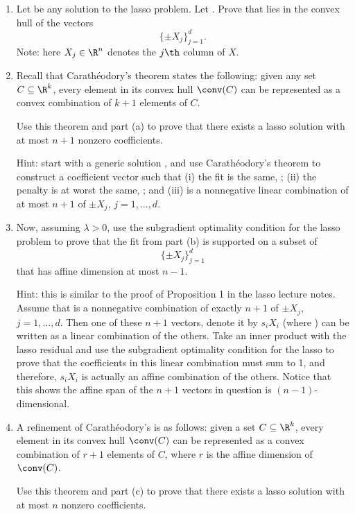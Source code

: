 \documentclass{article}
\begin{document}
\begin{enumerate}[label=(\alph*)]
\item Let \smash{$\hbeta$} be any solution to the lasso problem. Let
  . Prove that  lies in the convex hull of the vectors 
  \marginpar{\small [4 pts]}
  \[
  \{ \pm X_j \}_{j=1}^d.
  \]
  Note: here $X_j \in \R^n$ denotes the $j\th$ column of $X$.

\item Recall that Carath\'{e}odory's theorem states the following: given any set 
  $C \subseteq \R^k$, every element in its convex hull $\conv(C)$ can be 
  represented as a convex combination of $k+1$ elements of $C$. 

  Use this theorem and part (a) to prove that there exists a lasso solution
  \smash{$\tilde\beta$} with at most $n+1$ nonzero coefficients.  
  \marginpar{\small [4 pts]}

  Hint: start with a generic solution \smash{$\hbeta$}, and use
  Carath\'{e}odory's theorem to construct a coefficient vector
  \smash{$\tilde\beta$} such that (i) the fit is the same, ; (ii) the penalty is at worst the same,
  ; and (iii)
   is a nonnegative linear combination of at most $n+1$ of
  $\pm X_j$, $j=1,\dots,d$.  
 
\item Now, assuming $\lambda>0$, use the subgradient optimality condition for 
  the lasso problem to prove that the fit  from part (b)
  is supported on a subset of 
 \marginpar{\small [6 pts]}
  \[
  \{ \pm X_j \}_{j=1}^d
  \]
  that has affine dimension at most $n-1$.

  Hint: this is similar to the proof of Proposition 1 in the lasso lecture
  notes. Assume that  is a nonnegative combination of 
  exactly $n+1$ of $\pm X_j$, $j=1,\dots,d$. Then one of these $n+1$ vectors, 
  denote it by $s_i X_i$ (where ) can be
  written as a linear combination of the others. Take an inner product with the
  lasso residual and use the subgradient optimality condition for the lasso to
  prove that the coefficients in this linear combination must sum to 1, and
  therefore, $s_i X_i$ is actually an affine combination of the others. Notice
  that this shows the affine span of the $n+1$ vectors in question is
  $(n-1)$-dimensional.     

\item A refinement of Carath\'{e}odory's is as follows: given a set $C \subseteq
  \R^k$, every element in its convex hull $\conv(C)$ can be represented as a
  convex combination of $r+1$ elements of $C$, where $r$ is the affine dimension
  of $\conv(C)$. 

 Use this theorem and part (c) to prove that there exists a lasso solution
  \smash{$\check\beta$} with at most $n$ nonzero coefficients.  
  \marginpar{\small [4 pts]}
\end{enumerate}
\end{document}
